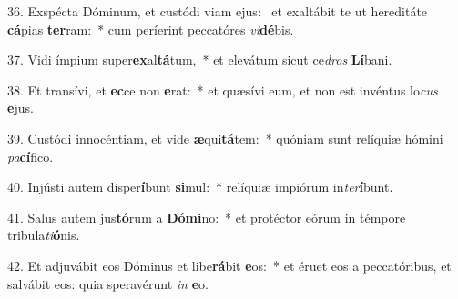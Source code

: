 36. Exspécta Dóminum, et custódi viam ejus: \dag\  et exaltábit te ut hereditáte \textbf{cá}pias \textbf{ter}ram:~*  cum períerint peccatóres \textit{vi}\textbf{dé}bis.\

37. Vidi ímpium super\textbf{ex}al\textbf{tá}tum,~*  et elevátum sicut ce\textit{dros} \textbf{Lí}bani.\

38. Et transívi, et \textbf{ec}ce non \textbf{e}rat:~*  et quæsívi eum, et non est invéntus lo\textit{cus} \textbf{e}jus.\

39. Custódi innocéntiam, et vide \textbf{æ}qui\textbf{tá}tem:~*  quóniam sunt relíquiæ hómini \textit{pa}\textbf{cí}fico.\

40. Injústi autem disper\textbf{í}bunt \textbf{si}mul:~*  relíquiæ impiórum in\textit{ter}\textbf{í}bunt.\

41. Salus autem jus\textbf{tó}rum a \textbf{Dó}\textbf{mi}no:~*  et protéctor eórum in témpore tribula\textit{ti}\textbf{ó}nis.\

42. Et adjuvábit eos Dóminus et libe\textbf{rá}bit \textbf{e}os:~*  et éruet eos a peccatóribus, et salvábit eos: quia speravérunt \textit{in} \textbf{e}o.\

